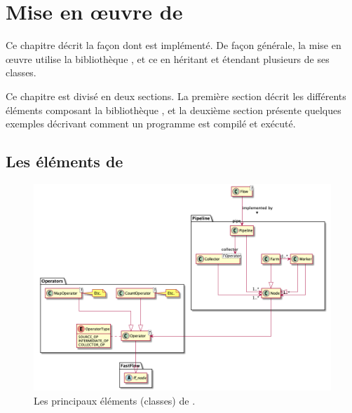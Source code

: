 
\chapter{Mise en \oe{}uvre de \PpFf}
\label{implementation.chap}


Ce chapitre décrit la fa\c{c}on dont  est impl\'ement\'e. 
%
De fa\c{c}on g\'en\'erale, la mise en \oe{}uvre utilise la biblioth\`eque , et ce en h\'eritant et \'etendant plusieurs de ses classes.

Ce chapitre est divis\'e en deux sections.
%
La premi\`ere section d\'ecrit les diff\'erents éléments composant la biblioth\`eque , et la deuxi\`eme section pr\'esente quelques exemples d\'ecrivant comment un programme \PpFf{} est compil\'e et ex\'ecut\'e.


\section{Les \'el\'ements de }


\begin{figure}
\centering
         \includegraphics[width=1.0\textwidth]{Figures/vueEnsemble.png}
      \caption{Les principaux éléments (classes) de .}
       \label{All.fig}
\end{figure}

